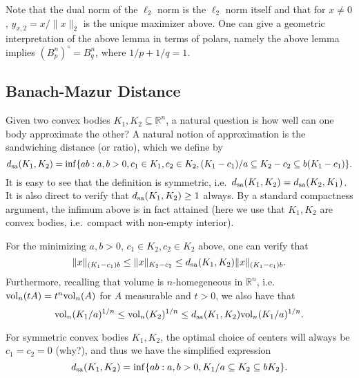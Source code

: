 \documentclass[11pt]{article}
\theoremstyle{plain}
\theoremstyle{plain}
\newcommand{\set}[1]{\{{#1}\}}
\newcommand{\R}{\ensuremath{\mathbb{R}}}
\begin{document}
Note that the dual norm of the $\ell_2$ norm is the $\ell_2$ norm itself and
that for $x \neq 0$, $y_{x,2} = x/\|x\|_2$ is the unique maximizer above. One
can give a geometric interpretation of the above lemma in terms of polars,
namely the above lemma implies $(B_p^n)^\circ = B_q^n$, where $1/p + 1/q = 1$.

\subsection{Banach-Mazur Distance}

Given two convex bodies $K_1,K_2 \subseteq \R^n$, a natural question is how well
can one body approximate the other? A natural notion of approximation is the
sandwiching distance (or ratio), which we define by
\begin{equation}
\label{def:sa-dist}
d_{\rm sa}(K_1,K_2) = \inf \set{ab: a,b > 0, c_1 \in K_1, c_2 \in K_2, (K_1-c_1)/a \subseteq
K_2-c_2 \subseteq b (K_1-c_1)} .
\end{equation}
It is easy to see that the definition is symmetric, i.e.~$d_{\rm sa}(K_1,K_2)
= d_{\rm sa}(K_2,K_1)$. It is also direct to verify that $d_{\rm sa}(K_1,K_2)
\geq 1$ always. By a standard compactness argument, the infimum above is in fact
attained (here we use that $K_1,K_2$ are convex bodies, i.e.~compact with
non-empty interior).  

For the minimizing $a,b > 0$, $c_1 \in K_2, c_2 \in K_2$ above, one can verify
that 
\[
\|x\|_{(K_1-c_1)b} \leq \|x\|_{K_2-c_2} \leq d_{\rm sa}(K_1,K_2) \|x\|_{(K_1-c_1)b}. 
\]
Furthermore, recalling that volume is $n$-homegeneous in $\R^n$, i.e.~${\rm
vol}_n(t A) = t^n {\rm vol}_n(A)$ for $A$ measurable and $t > 0$, we also have
that 
\[
{\rm vol}_n(K_1/a)^{1/n} \leq {\rm vol}_n(K_2)^{1/n} \leq d_{\rm sa}(K_1,K_2)
{\rm vol}_n(K_1/a)^{1/n} . 
\]

For symmetric convex bodies $K_1,K_2$, the optimal choice of centers will always
be $c_1=c_2=0$ (why?), and thus we have the simplified expression
\[
d_{\rm sa}(K_1,K_2) = \inf \set{ab: a,b > 0, K_1/a \subseteq K_2 \subseteq b K_2}.
\]
\end{document}
